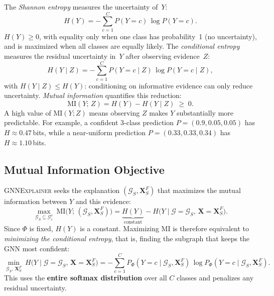 \documentclass{article}
\newcommand{\GNNEx}{\textsc{GNNExplainer}\xspace}
\newcommand{\MI}{\mathrm{MI}}
\newcommand{\calG}{\mathcal{G}}
\newcommand{\bfX}{\mathbf{X}}
\theoremstyle{definition}
\begin{document}
The \emph{Shannon entropy} measures the uncertainty of~$Y$:
\begin{equation}
  H(Y) = -\sum_{c=1}^{C} P(Y\!=\!c)\,\log P(Y\!=\!c).
  \label{eq:entropy}
\end{equation}
$H(Y) \geq 0$, with equality only when one class has probability~1 (no
uncertainty), and is maximized when all classes are equally likely.
The \emph{conditional entropy} measures the residual uncertainty in~$Y$
after observing evidence~$Z$:
\begin{equation}
  H(Y \mid Z) = -\sum_{c=1}^{C} P(Y\!=\!c \mid Z)\,\log P(Y\!=\!c \mid Z),
  \label{eq:cond_entropy_def}
\end{equation}
with $H(Y \mid Z) \leq H(Y)$: conditioning on informative evidence can
only reduce uncertainty.  \emph{Mutual information} quantifies this
reduction:
\begin{equation}
  \MI(Y;\, Z) = H(Y) - H(Y \mid Z) \;\geq\; 0.
  \label{eq:mi_def}
\end{equation}
A high value of $\MI(Y; Z)$ means observing $Z$ makes $Y$ substantially
more predictable.  For example, a confident 3-class prediction $P =
(0.9, 0.05, 0.05)$ has $H \approx 0.47$\,bits, while a near-uniform
prediction $P = (0.33, 0.33, 0.34)$ has $H \approx 1.10$\,bits.

\subsection{Mutual Information Objective}

\GNNEx seeks the explanation $(\calG_S, \bfX_S^F)$ that maximizes the mutual
information between $Y$ and this evidence:
\begin{equation}
  \max_{\calG_S \subseteq \calG_c^v}\ \MI\bigl(Y;\, (\calG_S, \bfX_S^F)\bigr)
  = \underbrace{H(Y)}_{\text{constant}} - H\bigl(Y \mid \calG\!=\!\calG_S,\,
                                       \bfX\!=\!\bfX_S^F\bigr).
  \label{eq:mi}
\end{equation}
Since $\Phi$ is fixed, $H(Y)$ is a constant.  Maximizing MI is therefore
equivalent to \emph{minimizing the conditional entropy}, that is, finding the
subgraph that keeps the GNN most confident:
\begin{equation}
  \min_{\calG_S,\, \bfX_S^F}\ H\bigl(Y \mid \calG\!=\!\calG_S,\,
                                       \bfX\!=\!\bfX_S^F\bigr)
  = -\sum_{c=1}^{C} P_\Phi(Y\!=\!c \mid \calG_S, \bfX_S^F)\,
    \log P_\Phi(Y\!=\!c \mid \calG_S, \bfX_S^F).
  \label{eq:cond_ent}
\end{equation}
This uses the \textbf{entire softmax distribution} over all $C$ classes and
penalizes any residual uncertainty.
\end{document}
